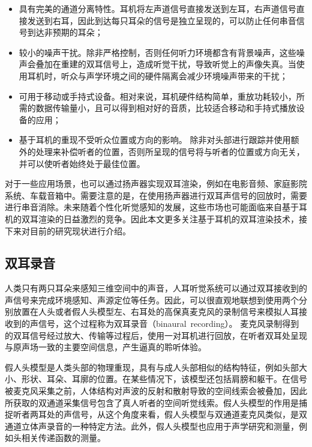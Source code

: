 \begin{itemize}[leftmargin=*]
\item 具有完美的通道分离特性。耳机将左声道信号直接发送到左耳，右声道信号直接发送到右耳，因此到达每只耳朵的信号是独立呈现的，可以防止任何串音信号到达非预期的耳朵；
\item 较小的噪声干扰。除非严格控制，否则任何听力环境都含有背景噪声，这些噪声会叠加在重建的双耳信号上，造成听觉干扰，导致听觉上的声像失真。当使用耳机时，听众与声学环境之间的硬件隔离会减少环境噪声带来的干扰；
\item 可用于移动或手持式设备。相对来说，耳机硬件结构简单，重放功耗较小，所需的数据传输量小，且可以得到相对好的音质，比较适合移动和手持式播放设备的应用；
\item 基于耳机的重现不受听众位置或方向的影响。 除非对头部进行跟踪并使用额外的处理来补偿听者的位置，否则所呈现的信号将与听者的位置或方向无关，并可以使听者始终处于最佳位置。
\end{itemize}

对于一些应用场景，也可以通过扬声器实现双耳渲染，例如在电影音频、家庭影院系统、车载音箱中。需要注意的是，在使用扬声器进行双耳声信号的回放时，需要进行串音消除。未来随着个性化听觉感知的发展，这些市场也可能面临来自基于耳机的双耳渲染的日益激烈的竞争。因此本文更多关注基于耳机的双耳渲染技术，接下来对目前的研究现状进行介绍。


\subsection{双耳录音 }

人类只有两只耳朵来感知三维空间中的声音，人耳听觉系统可以通过双耳接收到的声信号来完成环境感知、声源定位等任务。因此，可以很直观地联想到使用两个分别放置在人头或者假人头模型左、右耳处的高保真麦克风的录制信号来模拟人耳接收到的声信号，这个过程称为双耳录音（binaural~recording）。
麦克风录制得到的双耳信号经过放大、传输等过程后，使用一对耳机进行回放，在听者双耳处呈现与原声场一致的主要空间信息，产生逼真的聆听体验。


假人头模型是人类头部的物理重现，具有与成人头部相似的结构特征，例如头部大小、形状、耳朵、耳廓的位置。在某些情况下，该模型还包括肩膀和躯干。在信号被麦克风采集之前，人体结构对声波的反射和散射导致的空间线索会被叠加，因此所获取的双通道采集信号包含了真人听者的空间听觉线索。假人头模型的作用是捕捉听者两耳处的声信号，从这个角度来看，假人头模型与双通道麦克风类似，是双通道立体声录音的一种特定方法。此外，假人头模型也应用于声学研究和测量，例如头相关传递函数的测量。

